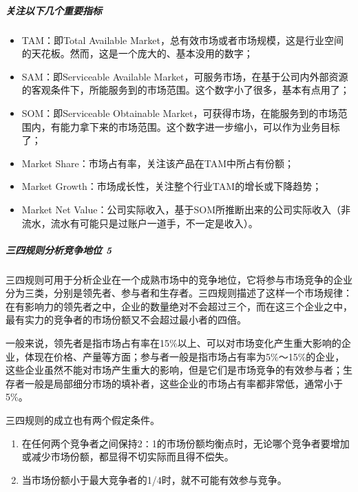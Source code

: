 \documentclass[letterpaper,10pt,english]{sphinxmanual}
\begin{document}
\subparagraph{关注以下几个重要指标}
\label{\detokenize{chapter_knowledge/industry_analysis:id15}}\begin{itemize}
\item {} 
TAM：即Total Available
Market，总有效市场或者市场规模，这是行业空间的天花板。然而，这是一个庞大的、基本没用的数字；

\item {} 
SAM：即Serviceable Available
Market，可服务市场，在基于公司内外部资源的客观条件下，所能服务到的市场范围。这个数字小了很多，基本有点用了；

\item {} 
SOM：即Serviceable Obtainable
Market，可获得市场，在能服务到的市场范围内，有能力拿下来的市场范围。这个数字进一步缩小，可以作为业务目标了；

\item {} 
Market Share：市场占有率，关注该产品在TAM中所占有份额；

\item {} 
Market Growth：市场成长性，关注整个行业TAM的增长或下降趋势；

\item {} 
Market Net
Value：公司实际收入，基于SOM所推断出来的公司实际收入（非流水，流水有可能只是过账户一道手，不一定是收入）。

\end{itemize}


\subparagraph{三四规则分析竞争地位 5\sphinxfootnotemark[508]}
\label{\detokenize{chapter_knowledge/industry_analysis:id16}}%
\begin{footnotetext}[508]\sphinxAtStartFootnote
{}
%
\end{footnotetext}\ignorespaces 
三四规则可用于分析企业在一个成熟市场中的竞争地位，它将参与市场竞争的企业分为三类，分别是领先者、参与者和生存者。三四规则描述了这样一个市场规律：在有影响力的领先者之中，企业的数量绝对不会超过三个，而在这三个企业之中，最有实力的竞争者的市场份额又不会超过最小者的四倍。

一般来说，领先者是指市场占有率在15\%以上、可以对市场变化产生重大影响的企业，体现在价格、产量等方面；参与者一般是指市场占有率为5\%～15\%的企业，这些企业虽然不能对市场产生重大的影响，但是它们是市场竞争的有效参与者；生存者一般是局部细分市场的填补者，这些企业的市场占有率都非常低，通常小于5\%。

三四规则的成立也有两个假定条件。
\begin{enumerate}
%
\item {} 
在任何两个竞争者之间保持2∶1的市场份额均衡点时，无论哪个竞争者要增加或减少市场份额，都显得不切实际而且得不偿失。

\item {} 
当市场份额小于最大竞争者的1/4时，就不可能有效参与竞争。

\end{enumerate}
\end{document}
